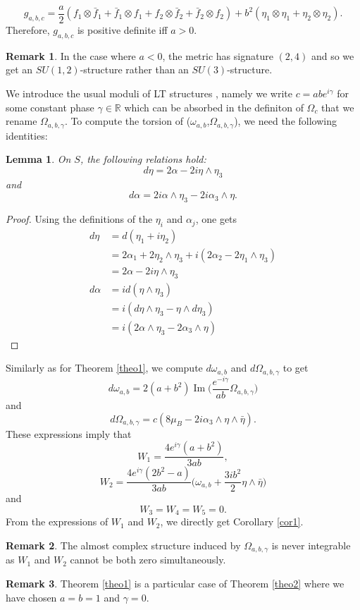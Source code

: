 \documentclass[12pt, reqno]{amsart}
\newtheorem{lemma}[Def]{Lemma}
\theoremstyle{definition}
\newtheorem{rk}{Remark}[subsection]
\DeclareMathOperator\Ima{Im}
\newcommand{\R}{\mathbb{R}}
\begin{document}
$$g_{a,b,c}=\frac{a}{2}(f_1\otimes\bar f_1+\bar f_1\otimes f_1+f_2\otimes\bar f_2+\bar f_2\otimes f_2)+b^2(\eta_1\otimes\eta_1+\eta_2\otimes\eta_2).$$ Therefore, $g_{a,b,c}$ is positive definite iff $a>0$. 
\begin{rk}
    In the case where $a<0$, the metric has signature $(2,4)$ and so we get an $SU(1,2)$-structure rather than an $SU(3)$-structure. 
\end{rk}
We introduce the usual moduli of LT structures \cite{Larfors_2010,Larfors_2013}, namely we write $c=abe^{i\gamma}$ for some constant phase $\gamma\in\R$ which can be absorbed in the definiton of $\Omega_c$ that we rename $\Omega_{a,b,\gamma}$. To compute the torsion of ($\omega_{a,b}$,$\Omega_{a,b,\gamma}$), we need the following identities:
\begin{lemma}
    On $S$, the following relations hold:
    $$d\eta=2\alpha-2i\eta\wedge\eta_3$$ and $$d\alpha=2i\alpha\wedge\eta_3-2i\alpha_3\wedge\eta.$$
\end{lemma}
\begin{proof}
Using the definitions of the $\eta_i$ and $\alpha_j$, one gets  
    \begin{align*}
        d\eta&=d(\eta_1+i\eta_2)\\
        &=2\alpha_1+2\eta_2\wedge\eta_3+i(2\alpha_2-2\eta_1\wedge\eta_3)\\
        &=2\alpha-2i\eta\wedge\eta_3\\
        d\alpha&=id(\eta\wedge\eta_3)\\
        &=i(d\eta\wedge\eta_3-\eta\wedge d\eta_3)\\
        &=i(2\alpha\wedge\eta_3-2\alpha_3\wedge\eta)
    \end{align*}
\end{proof}
Similarly as for Theorem \ref{theo1}, we compute $d\omega_{a,b}$ and $d\Omega_{a,b,\gamma}$ to get
$$d\omega_{a,b}=2(a+b^2)\Ima\bigg(\frac{e^{-i\gamma}}{ab}\Omega_{a,b,\gamma}\bigg)$$ and $$d\Omega_{a,b,\gamma}=c(8\mu_B-2i\alpha_3\wedge\eta\wedge\bar\eta).$$ These expressions imply that $$W_1=\frac{4e^{i\gamma}(a+b^2)}{3ab},$$ $$W_2=\frac{4e^{i\gamma}(2b^2-a)}{3ab}\bigg(\omega_{a,b}+\frac{3ib^2}{2}\eta\wedge\bar\eta\bigg)$$ and $$W_3=W_4=W_5=0.$$ \indent From the expressions of $W_1$ and $W_2$, we directly get Corollary \ref{cor1}.
\begin{rk}
    The almost complex structure induced by $\Omega_{a,b,\gamma}$ is never integrable as $W_1$ and $W_2$ cannot be both zero simultaneously. 
\end{rk}
\begin{rk}
    Theorem \ref{theo1} is a particular case of Theorem \ref{theo2} where we have chosen $a=b=1$ and $\gamma=0$. 
\end{rk}
\end{document}
